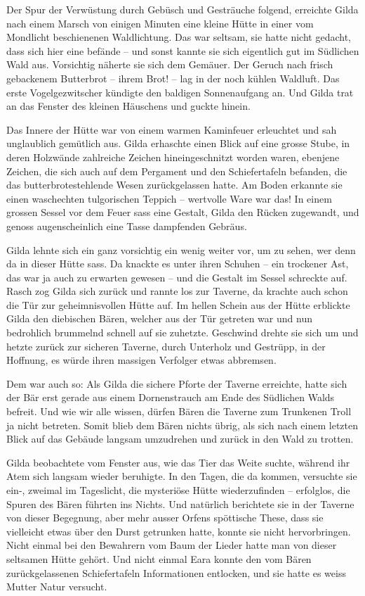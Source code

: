 Der Spur der Verwüstung durch Gebüsch und Gesträuche folgend, erreichte Gilda nach einem Marsch von einigen Minuten eine kleine Hütte in einer vom Mondlicht beschienenen Waldlichtung. Das war seltsam, sie hatte nicht gedacht, dass sich hier eine befände – und sonst kannte sie sich eigentlich gut im Südlichen Wald aus. Vorsichtig näherte sie sich dem Gemäuer. Der Geruch nach frisch gebackenem Butterbrot – ihrem Brot! – lag in der noch kühlen Waldluft. Das erste Vogelgezwitscher kündigte den baldigen Sonnenaufgang an. Und Gilda trat an das Fenster des kleinen Häuschens und guckte hinein.

Das Innere der Hütte war von einem warmen Kaminfeuer erleuchtet und sah unglaublich gemütlich aus. Gilda erhaschte einen Blick auf eine grosse Stube, in deren Holzwände zahlreiche Zeichen hineingeschnitzt worden waren, ebenjene Zeichen, die sich auch auf dem Pergament und den Schiefertafeln befanden, die das butterbrotestehlende Wesen zurückgelassen hatte. Am Boden erkannte sie einen waschechten tulgorischen Teppich – wertvolle Ware war das! In einem grossen Sessel vor dem Feuer sass eine Gestalt, Gilda den Rücken zugewandt, und genoss augenscheinlich eine Tasse dampfenden Gebräus.

Gilda lehnte sich ein ganz vorsichtig ein wenig weiter vor, um zu sehen, wer denn da in dieser Hütte sass. Da knackte es unter ihren Schuhen – ein trockener Ast, das war ja auch zu erwarten gewesen – und die Gestalt im Sessel schreckte auf. Rasch zog Gilda sich zurück und rannte los zur Taverne, da krachte auch schon die Tür zur geheimnisvollen Hütte auf. Im hellen Schein aus der Hütte erblickte Gilda den diebischen Bären, welcher aus der Tür getreten war und nun bedrohlich brummelnd schnell auf sie zuhetzte. Geschwind drehte sie sich um und hetzte zurück zur sicheren Taverne, durch Unterholz und Gestrüpp, in der Hoffnung, es würde ihren massigen Verfolger etwas abbremsen.

Dem war auch so: Als Gilda die sichere Pforte der Taverne erreichte, hatte sich der Bär erst gerade aus einem Dornenstrauch am Ende des Südlichen Walds befreit. Und wie wir alle wissen, dürfen Bären die Taverne zum Trunkenen Troll ja nicht betreten. Somit blieb dem Bären nichts übrig, als sich nach einem letzten Blick auf das Gebäude langsam umzudrehen und zurück in den Wald zu trotten.

Gilda beobachtete vom Fenster aus, wie das Tier das Weite suchte, während ihr Atem sich langsam wieder beruhigte. In den Tagen, die da kommen, versuchte sie ein-, zweimal im Tageslicht, die mysteriöse Hütte wiederzufinden – erfolglos, die Spuren des Bären führten ins Nichts. Und natürlich berichtete sie in der Taverne von dieser Begegnung, aber mehr ausser Orfens spöttische These, dass sie vielleicht etwas über den Durst getrunken hatte, konnte sie nicht hervorbringen. Nicht einmal bei den Bewahrern vom Baum der Lieder hatte man von dieser seltsamen Hütte gehört. Und nicht einmal Eara konnte den vom Bären zurückgelassenen Schiefertafeln Informationen entlocken, und sie hatte es weiss Mutter Natur versucht.


